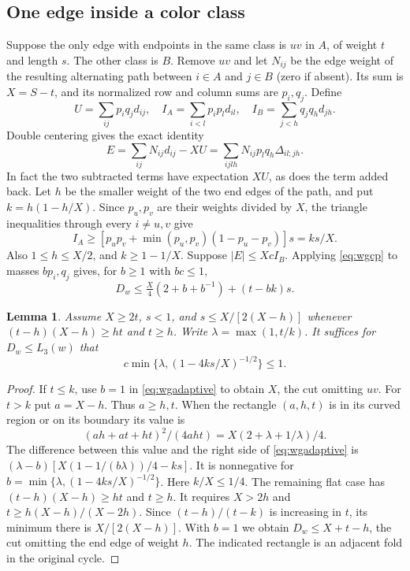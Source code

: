 \documentclass[11pt,a4paper]{article}
\newtheorem{lemma}[theorem]{Lemma}
\theoremstyle{definition}
\begin{document}
\subsection{One edge inside a color class}

Suppose the only edge with endpoints in the same class is $uv$ in
$A$, of weight $t$ and length $s$. The other class is $B$. Remove
$uv$ and let $N_{ij}$ be the edge weight of the resulting
alternating path between $i\in A$ and $j\in B$ (zero if absent).
Its sum is $X=S-t$, and its normalized row and column sums are
$p_i,q_j$. Define
\[
 U=\sum_{ij}p_iq_jd_{ij},\quad
 I_A=\sum_{i<l}p_ip_ld_{il},\quad I_B=\sum_{j<h}q_jq_hd_{jh}.
\]
Double centering gives the exact identity
\begin{equation}
 E=\sum_{ij}N_{ij}d_{ij}-XU
   =\sum_{ijlh}N_{ij}p_lq_h\Delta_{il;jh}.
 \label{eq:wgcenter}
\end{equation}
In fact the two subtracted terms have expectation $XU$, as does the
term added back. Let $h$ be the smaller weight of the two end edges of
the path, and put $k=h(1-h/X)$. Since $p_u,p_v$ are their weights
divided by $X$, the triangle inequalities through every $i\ne u,v$
give
\[
 I_A\ge[p_up_v+\min(p_u,p_v)(1-p_u-p_v)]s=ks/X .
\]
Also $1\le h\le X/2$, and $k\ge1-1/X$. Suppose $|E|\le Xc I_B$.
Applying \eqref{eq:wgcp} to masses $bp_i,q_j$ gives, for $b\ge1$
with $bc\le1$,
\begin{equation}
 D_w\le \tfrac X4(2+b+b^{-1})+(t-bk)s.\label{eq:wgadaptive}
\end{equation}

\begin{lemma}\label{lem:wgtwo}
Assume $X\ge2t$, $s<1$, and $s\le X/[2(X-h)]$ whenever
$(t-h)(X-h)\ge ht$ and $t\ge h$. Write $\lambda=\max(1,t/k)$.
It suffices for $D_w\le L_3(w)$ that
\[
 c\min\{\lambda,(1-4ks/X)^{-1/2}\}\le1 .
\]
\end{lemma}
\begin{proof}
If $t\le k$, use $b=1$ in \eqref{eq:wgadaptive} to obtain $X$,
the cut omitting $uv$. For $t>k$ put $a=X-h$. Thus $a\ge h,t$.
When the rectangle $(a,h,t)$ is in its curved region or on its
boundary its value is
\[
 (ah+at+ht)^2/(4aht)=X(2+\lambda+1/\lambda)/4 .
\]
The difference between this value and the right side of
\eqref{eq:wgadaptive} is
$(\lambda-b)[X(1-1/(b\lambda))/4-ks]$.
It is nonnegative for $b=\min\{\lambda,(1-4ks/X)^{-1/2}\}$.
Here $k/X\le1/4$. The remaining flat case has
$(t-h)(X-h)\ge ht$ and $t\ge h$. It requires $X>2h$ and
$t\ge h(X-h)/(X-2h)$. Since $(t-h)/(t-k)$ is increasing in $t$,
its minimum there is $X/[2(X-h)]$. With $b=1$ we obtain
$D_w\le X+t-h$, the cut omitting the end edge of weight $h$.
The indicated rectangle is an adjacent fold in the original cycle.
\end{proof}
\end{document}
